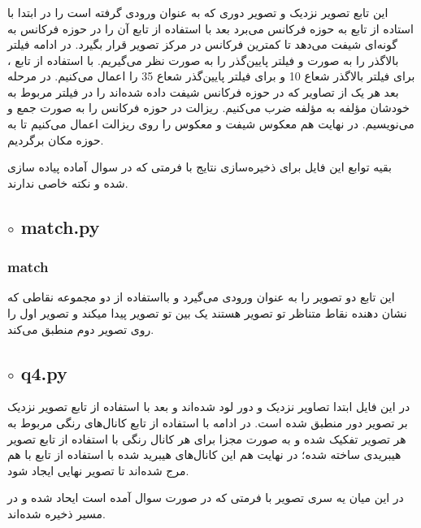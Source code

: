 \documentclass[a4paper,12pt]{article}
\begin{document}
 \subsubsection*{}
 این تابع تصویر نزدیک و تصویر دوری که به عنوان ورودی گرفته است را در ابتدا با استاده از تابع 
 به حوزه فرکانس می‌برد بعد با استفاده از تابع 
 آن را در حوزه فرکانس به گونه‌ای شیفت می‌دهد تا کمترین فرکانس در مرکز تصویر قرار بگیرد. در ادامه فیلتر بالاگذر را به صورت 
 و فیلتر پایین‌گذر را به صورت 
 نظر می‌گیریم. با استفاده از تابع 
  ،
برای فیلتر بالاگذر شعاع 10 و برای فیلتر پایین‌گذر شعاع 35 را اعمال می‌کنیم. در مرحله بعد هر یک از تصاویر که در حوزه فرکانس شیفت داده شده‌اند را در فیلتر مربوط به خودشان مؤلفه  به مؤلفه ضرب می‌کنیم. ریزالت در حوزه فرکانس را به صورت جمع 
و
می‌نویسیم. در نهایت هم معکوس شیفت و معکوس 
 را روی ریزالت اعمال می‌کنیم تا به حوزه مکان برگردیم.
 
 بقیه توابع این فایل برای ذخیره‌سازی نتایج با فرمتی که در سوال آماده پیاده سازی شده و نکته خاصی ندارند.
\subsection*{$\circ$ match.py}
\subsubsection*{match}
این تابع دو تصویر را به عنوان ورودی می‌گیرد و بااستفاده از دو مجموعه نقاطی که نشان دهنده نقاط متناظر تو تصویر هستند یک 
بین تو تصویر پیدا میکند و تصویر اول را روی تصویر دوم منطبق می‌کند.
\subsection*{$\circ$ q4.py}
در این فایل ابتدا تصاویر نزدیک و دور لود شده‌اند و بعد با استفاده از تابع 
تصویر نزدیک بر تصویر دور منطبق شده است. در ادامه با استفاده از تابع
کانال‌های رنگی مربوط به هر تصویر تفکیک شده و به صورت مجزا برای هر کانال رنگی با استفاده از تابع
تصویر هیبریدی ساخته شده؛ در نهایت هم این کانال‌های هیبرید شده با استفاده از تابع 
با هم مرج شده‌اند تا تصویر نهایی ایجاد شود.

در این میان یه سری تصویر با فرمتی که در صورت سوال آمده است ایحاد شده و در مسیر
ذخیره شده‌اند.
\end{document}
